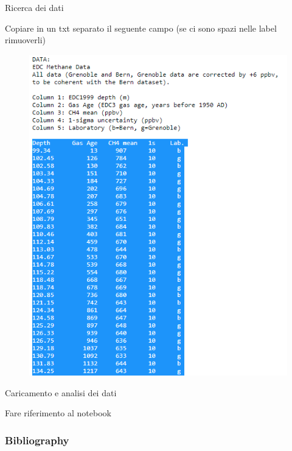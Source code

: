 \documentclass{beamer}
\begin{document}
\begin{frame}{Ricerca dei dati}
\begin{center}
Copiare in un txt separato il seguente campo (se ci sono spazi nelle label rimuoverli)
\end{center}
\begin{figure}
\begin{center}
\includegraphics[width=\textwidth ]{Pic/CH4_DATA.png}
\end{center}
\end{figure}
\end{frame}


\begin{frame}{Caricamento e analisi dei dati}
\begin{center}
Fare riferimento al notebook 
\end{center}
\end{frame}


\begin{frame}[t,allowframebreaks]
\frametitle{Bibliography}
\printbibliography
\end{frame}
\end{document}
